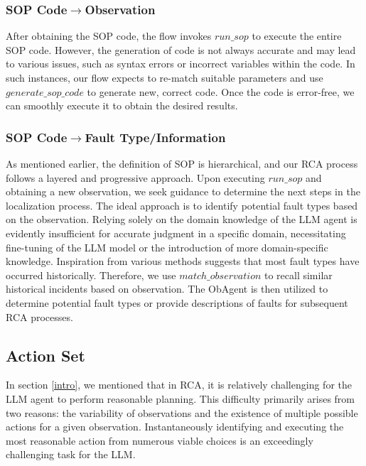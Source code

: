 \subsubsection{SOP Code$\rightarrow$Observation}

After obtaining the SOP code, the flow invokes $run\_sop$ to execute the entire SOP code. However, the generation of code is not always accurate and may lead to various issues, such as syntax errors or incorrect variables within the code. In such instances, our flow expects to re-match suitable parameters and use $generate\_sop\_code$ to generate new, correct code. Once the code is error-free, we can smoothly execute it to obtain the desired results.

\subsubsection{SOP Code$\rightarrow$Fault Type/Information}

As mentioned earlier, the definition of SOP is hierarchical, and our RCA process follows a layered and progressive approach. Upon executing $run\_sop$ and obtaining a new observation, we seek guidance to determine the next steps in the localization process. The ideal approach is to identify potential fault types based on the observation. Relying solely on the domain knowledge of the LLM agent is evidently insufficient for accurate judgment in a specific domain, necessitating fine-tuning of the LLM model or the introduction of more domain-specific knowledge. Inspiration from various methods \citep{chen2024automatic} suggests that most fault types have occurred historically. Therefore, we use $match\_observation$ to recall similar historical incidents based on observation. The ObAgent is then utilized to determine potential fault types or provide descriptions of faults for subsequent RCA processes.


\subsection{Action Set}

In section \ref{intro}, we mentioned that in RCA, it is relatively challenging for the LLM agent to perform reasonable planning. This difficulty primarily arises from two reasons: the variability of observations and the existence of multiple possible actions for a given observation. Instantaneously identifying and executing the most reasonable action from numerous viable choices is an exceedingly challenging task for the LLM.

